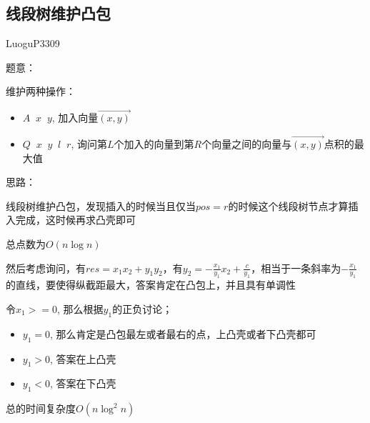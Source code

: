 \subsection{线段树维护凸包}

LuoguP3309\par
题意：\par
维护两种操作：
\begin{itemize}
\item $A\;\;x\;\;y$, 加入向量$\overrightarrow{(x, y)}$
\item $Q\;\;x\;\;y\;\;l\;\;r$, 询问第$L$个加入的向量到第$R$个向量之间的向量与$\overrightarrow{(x, y)}$点积的最大值\par
\end{itemize}

思路：\par
线段树维护凸包，发现插入的时候当且仅当$pos = r$的时候这个线段树节点才算插入完成，这时候再求凸壳即可\par
总点数为$O(n \log n)$\par
然后考虑询问，有$res = x_1x_2 + y_1y_2$，有$y_2 = -\frac{x_1}{y_1}x_2 + \frac{c}{y_1}$，相当于一条斜率为$-\frac{x_1}{y_1}$的直线，要使得纵截距最大，答案肯定在凸包上，并且具有单调性\par
令$x_1 >= 0$, 那么根据$y_1$的正负讨论；
\begin{itemize}
\item $y_1 = 0$, 那么肯定是凸包最左或者最右的点，上凸壳或者下凸壳都可
\item $y_1 > 0$, 答案在上凸壳
\item $y_1 < 0$, 答案在下凸壳
\end{itemize}

总的时间复杂度$O(n \log^2 n)$



